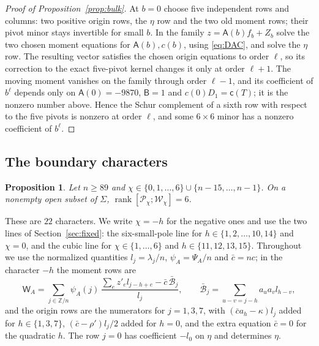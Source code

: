 \documentclass{amsart}
\newtheorem{proposition}[theorem]{Proposition}
\theoremstyle{definition}
\theoremstyle{remark}
\numberwithin{equation}{section}
\newcommand{\ZZ}{\mathbb{Z}}
\DeclareMathOperator{\rank}{rank}
\begin{document}
\begin{proof}[Proof of Proposition~\ref{prop:bulk}]
At $b=0$ choose five independent rows and columns: two positive origin rows, the
$\eta$ row and the two old moment rows; their pivot minor stays invertible for small
$b$. In the family $z=\mathsf A(b)f_b+Z_b$ solve the two chosen moment equations for
$\mathsf A(b),c(b)$, using \eqref{eq:DAC}, and solve the $\eta$ row. The resulting
vector satisfies the chosen origin equations to order $\ell$, so its correction to the
exact five-pivot kernel changes it only at order $\ell+1$. The moving moment vanishes
on the family through order $\ell-1$, and its coefficient of $b^\ell$ depends only on
$\mathsf A(0)=-9870$, $\mathsf B=1$ and $c(0)D_1=\mathsf c(T)$; it is the nonzero number
above. Hence the Schur complement of a sixth row with respect to the five pivots is
nonzero at order $\ell$, and some $6\times6$ minor has a nonzero coefficient of
$b^\ell$.
\end{proof}

\subsection{The boundary characters}
\begin{proposition}\label{prop:boundary}
Let $n\ge89$ and
$\chi\in\{0,1,\dots,6\}\cup\{n-15,\dots,n-1\}$. On a nonempty open subset of
$\Sigma$, $\rank[\mathcal P_\chi;\mathcal W_\chi]=6$.
\end{proposition}

These are $22$ characters. We write $\chi=-h$ for the negative ones and use the two
lines of Section~\ref{sec:fixed}: the six-small-pole line for
$h\in\{1,2,\dots,10,14\}$ and $\chi=0$, and the cubic line for
$\chi\in\{1,\dots,6\}$ and $h\in\{11,12,13,15\}$. Throughout we use the normalized
quantities $l_j=\lambda_j/n$, $\psi_A=\Psi_A/n$ and $\bar c=nc$; in the character $-h$
the moment rows are
\[
  \mathsf W_A=\sum_{j\in\ZZ/n}\psi_A(j)\,\frac{\sum_ez'_el_{j-h+e}-\bar c\,\bar{\mathcal B}_j}
  {l_j},\qquad \bar{\mathcal B}_j=\sum_{u-v=j-h}a_ua_vl_{h-v},
\]
and the origin rows are the numerators for $j=1,3,7$, with $(\bar ca_h-\kappa)l_j$ added
for $h\in\{1,3,7\}$, $(\bar c-\rho')l_j/2$ added for $h=0$, and the extra equation
$\bar c=0$ for the quadratic $h$. The row $j=0$ has coefficient $-l_0$ on $\eta$ and
determines $\eta$.
\end{document}
